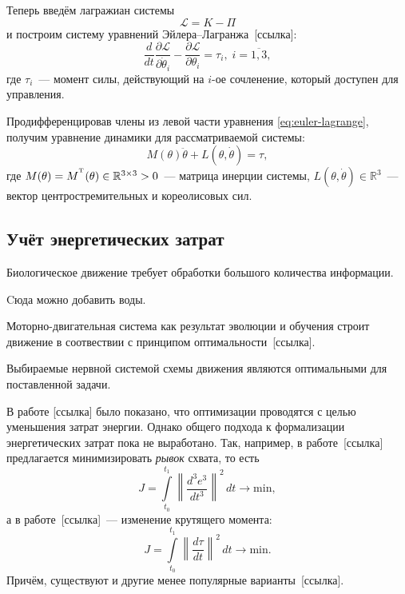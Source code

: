 Теперь введём лагражиан системы
$$
    \mathcal{L} = K - \Pi
$$
и построим систему уравнений Эйлера--Лагранжа~[ссылка]:
\begin{equation}\label{eq:euler-lagrange}
    \frac{d}{dt} \frac{\partial \mathcal{L}}{\partial \dot \theta_i} - \frac{\partial \mathcal{L}}{\partial \theta_i} = \tau_i,\; i = \overline{1, 3},
\end{equation}
где $\tau_i$~--- момент силы, действующий на $i$-ое сочленение, который доступен для управления.

Продифференцировав члены из левой части уравнения \eqref{eq:euler-lagrange}, получим уравнение динамики для рассматриваемой системы:
\begin{equation}\label{eq:dynamic}
    M(\theta)\ddot\theta + L(\theta, \dot\theta) = \tau,
\end{equation}
где $M(\theta) = M^{^\mathrm{T}}(\theta) \in \mathbb{R}^{3 \times 3} > 0$~--- матрица инерции системы, $L(\theta, \dot\theta)\in\mathbb{R}^{3}$~--- вектор центростремительных и кореолисовых сил.


\subsection{Учёт энергетических затрат}

Биологическое движение требует обработки большого количества информации.

{\color{red} Cюда можно добавить воды.}

Моторно-двигательная система как результат эволюции и обучения строит движение в соотвествии с принципом оптимальности~[ссылка].

\begin{assertion}
    Выбираемые нервной системой схемы движения являются оптимальными для поставленной задачи.
\end{assertion}

В работе [ссылка] было показано, что оптимизации проводятся с целью уменьшения затрат энергии.
Однако общего подхода к формализации энергетических затрат пока не выработано.
Так, например, в работе~[ссылка] предлагается минимизировать \textit{рывок} схвата, то есть
$$
    J = \int\limits_{t_0}^{t_1}\left\|
        \frac{d^3e^3}{dt^3}
    \right\|^2\, dt \longrightarrow \mathrm{min},
$$
а в работе~[ссылка]~--- изменение крутящего момента:
\begin{equation}\label{eq:energy-cost}
    J = \int\limits_{t_0}^{t_1}\left\|
        \frac{d\tau}{dt}
    \right\|^2\, dt \longrightarrow \mathrm{min}.
\end{equation}
Причём, существуют и другие менее популярные варианты~[ссылка].

